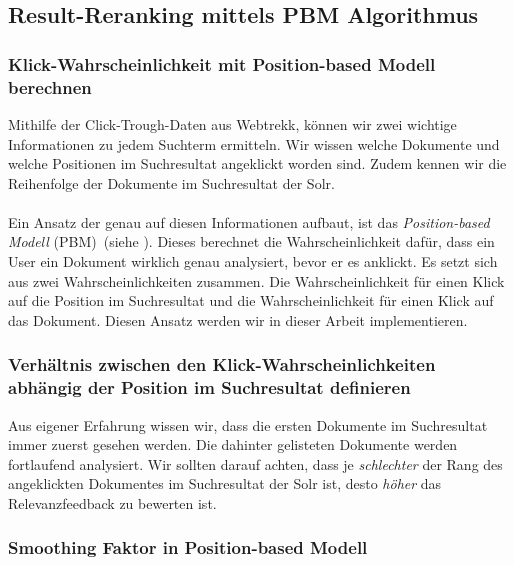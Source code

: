 \subsection{Result-Reranking mittels PBM Algorithmus}
\label{sec:Reranking:Methodik:Result-RerankingPBM}

\subsubsection{Klick-Wahrscheinlichkeit mit Position-based Modell berechnen}
\label{sec:Reranking:Methodik:Result-RerankingPBM:Klick-Wahrscheinlichkeit}

Mithilfe der Click-Trough-Daten aus Webtrekk, können wir zwei wichtige Informationen zu jedem Suchterm ermitteln. Wir wissen welche Dokumente und welche Positionen im Suchresultat angeklickt worden sind. Zudem kennen wir die Reihenfolge der Dokumente im Suchresultat der Solr.
\\
\\
Ein Ansatz der genau auf diesen Informationen aufbaut, ist das \textit{Position-based Modell} (PBM)~(siehe \cite{pbm}). Dieses berechnet die Wahrscheinlichkeit dafür, dass ein User ein Dokument wirklich genau analysiert, bevor er es anklickt. Es setzt sich aus zwei Wahrscheinlichkeiten zusammen. Die Wahrscheinlichkeit für einen Klick auf die Position im Suchresultat und die Wahrscheinlichkeit für einen Klick auf das Dokument. Diesen Ansatz werden wir in dieser Arbeit implementieren.

\subsubsection{Verhältnis zwischen den Klick-Wahrscheinlichkeiten abhängig der Position im Suchresultat definieren}
\label{sec:Reranking:Methodik:Result-RerankingPBM:VerhaeltnisKlick-Wahrscheinlichkeiten}

Aus eigener Erfahrung wissen wir, dass die ersten Dokumente im Suchresultat immer zuerst gesehen werden. Die dahinter gelisteten Dokumente werden fortlaufend analysiert. Wir sollten darauf achten, dass je \textit{schlechter} der Rang des angeklickten Dokumentes im Suchresultat der Solr ist, desto \textit{höher} das Relevanzfeedback zu bewerten ist.

\subsubsection{Smoothing Faktor in Position-based Modell}
\label{sec:Reranking:Methodik:Result-RerankingPBM:SmoothingPBM}

